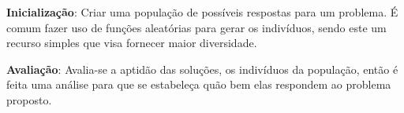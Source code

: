 \begin{minipage}{\linewidth}
	\label{fig:EstruturaAG}
\end{minipage}

\textbf{Inicialização}: Criar uma população de possíveis respostas para um problema. 
É comum fazer uso de funções aleatórias para gerar os indivíduos, sendo este um recurso simples que visa fornecer maior diversidade.

\textbf{Avaliação}: Avalia-se a aptidão das soluções, os indivíduos da população, então é feita uma análise para que se estabeleça quão bem elas respondem ao problema proposto.

